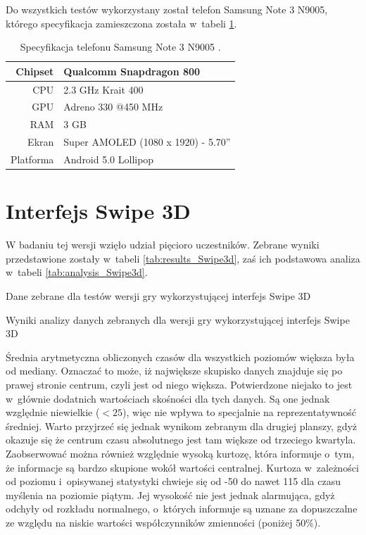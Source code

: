 \documentclass[a4paper,12pt,numbers=noenddot]{report}
\begin{document}
Do wszystkich testów wykorzystany został telefon Samsung Note 3 N9005, którego specyfikacja zamieszczona została w~tabeli \ref{tab:tab_telSpec}.

\begin{table}[H]
  \centering
  \caption{Specyfikacja telefonu Samsung Note 3 N9005 \cite{online_Note3Spec}.}
  \label{tab:tab_telSpec}
  \begin{tabular}{|r|l|}
    \hline
    Chipset & Qualcomm Snapdragon 800 \\
    \hline
    CPU & 2.3 GHz Krait 400\\
    \hline
    GPU & Adreno 330 @450 MHz\\
    \hline
    RAM & 3 GB\\
    \hline
    Ekran & Super AMOLED (1080 x 1920) - 5.70''\\
    \hline
    Platforma & Android 5.0 Lollipop\\
    \hline
  \end{tabular}
\end{table}


\section{Interfejs Swipe 3D}%
W badaniu tej wersji wzięło udział pięcioro uczestników. Zebrane wyniki przedstawione zostały w~tabeli \ref{tab:results_Swipe3d}, zaś ich podstawowa analiza w~tabeli \ref{tab:analysis_Swipe3d}. 

\begin{table}

  \caption{Dane zebrane dla testów wersji gry wykorzystującej interfejs Swipe 3D}
  \resizebox{\textwidth}{!}{%
	
  }
  \label{tab:results_Swipe3d}%
  \caption{Wyniki analizy danych zebranych dla wersji gry wykorzystującej interfejs Swipe 3D}
  \resizebox{\textwidth}{!}{%
	
  }
  \label{tab:analysis_Swipe3d}%
\end{table}%

Średnia arytmetyczna obliczonych czasów dla wszystkich poziomów większa była od mediany. Oznaczać to może, iż największe skupisko danych znajduje się po prawej stronie centrum, czyli jest od niego większa. Potwierdzone niejako to jest w~głównie dodatnich wartościach skośności dla tych danych. Są one jednak względnie niewielkie ($<25$), więc nie wpływa to specjalnie na reprezentatywność średniej. 
Warto przyjrzeć się jednak wynikom zebranym dla drugiej planszy, gdyż okazuje się że centrum czasu absolutnego jest tam większe od trzeciego kwartyla. Zaobserwować można również względnie wysoką kurtozę, która informuje o~tym, że informacje są bardzo skupione wokół wartości centralnej.
Kurtoza w~zależności od poziomu i~opisywanej statystyki chwieje się od -50 do nawet 115 dla czasu myślenia na poziomie piątym. Jej wysokość nie jest jednak alarmująca, gdyż odchyły od rozkładu normalnego, o~których informuje są uznane za dopuszczalne ze względu na niskie wartości współczynników zmienności (poniżej 50\%).
\end{document}

